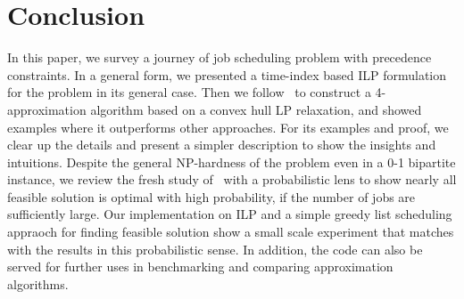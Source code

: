 \section{Conclusion} \label{s:conclusion}
In this paper, we survey a journey of job scheduling problem with precedence constraints. In a general form, we presented a time-index based ILP formulation for the problem in its general case. Then we follow~\cite{queyranne2006approximation} to construct a 4-approximation algorithm based on a convex hull LP relaxation, and showed examples where it outperforms other approaches. For its examples and proof, we clear up the details and present a simpler description to show the insights and intuitions. Despite the general NP-hardness of the problem even in a 0-1 bipartite instance, we review the fresh study of~\cite{schulz2011near} with a probabilistic lens to show nearly all feasible solution is optimal with high probability, if the number of jobs are sufficiently large. Our implementation on ILP and a simple greedy list scheduling appraoch for finding feasible solution show a small scale experiment that matches with the results in this probabilistic sense. In addition, the code can also be served for further uses in benchmarking and comparing approximation algorithms. 